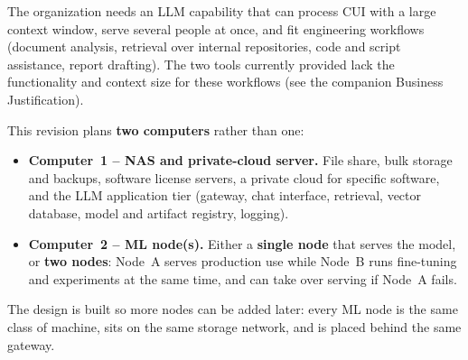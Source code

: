 
The organization needs an LLM capability that can process CUI with a large
context window, serve several people at once, and fit engineering workflows
(document analysis, retrieval over internal repositories, code and script
assistance, report drafting). The two tools currently provided lack the
functionality and context size for these workflows (see the companion Business
Justification).

This revision plans \textbf{two computers} rather than one:

\begin{itemize}
  \item \textbf{Computer~1 -- NAS and private-cloud server.} File share,
    bulk storage and backups, software license servers, a private cloud for
    specific software, and the LLM application tier (gateway, chat interface,
    retrieval, vector database, model and artifact registry, logging).
  \item \textbf{Computer~2 -- ML node(s).} Either a \textbf{single node} that
    serves the model, or \textbf{two nodes}: Node~A serves production use
    while Node~B runs fine-tuning and experiments at the same time, and can
    take over serving if Node~A fails.
\end{itemize}

The design is built so more nodes can be added later: every ML node is the same
class of machine, sits on the same storage network, and is placed behind the
same gateway.

